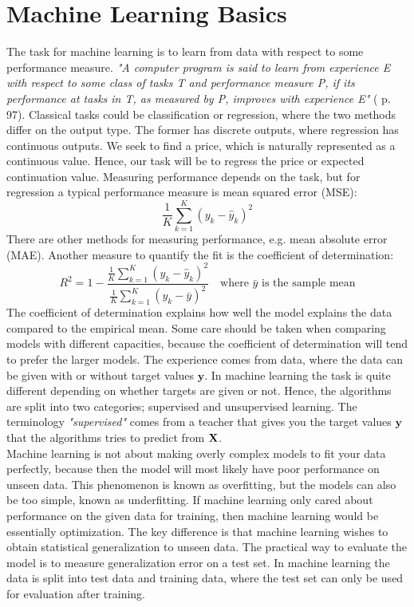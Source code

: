 \section{Machine Learning Basics}
The task for machine learning is to learn from data with respect to some performance measure. \textsl{"A computer program is said to learn from experience E with respect to some class of tasks T and performance measure P, if its performance at tasks in T, as measured by P, improves with experience E"} (\parencite{Goodfellow-et-al-2016} p. 97). Classical tasks could be classification or regression, where the two methods differ on the output type. The former has discrete outputs, where regression has continuous outputs. We seek to find a price, which is naturally represented as a continuous value. Hence, our task will be to regress the price or expected continuation value. Measuring performance depends on the task, but for regression a typical performance measure is mean squared error (MSE):
$$\frac{1}{K}\sum_{k=1}^{K} (y_k-\hat{y}_k)^2$$
There are other methods for measuring performance, e.g. mean absolute error (MAE). Another measure to quantify the fit is the coefficient of determination:
$$R^2=1-\frac{\frac{1}{K}\sum_{k=1}^{K} (y_k-\hat{y}_k)^2}{\frac{1}{K}\sum_{k=1}^{K} (y_k-\bar{y})^2} \quad \text{where $\bar{y}$ is the sample mean}$$
The coefficient of determination explains how well the model explains the data compared to the empirical mean. Some care should be taken when comparing models with different capacities, because the coefficient of determination will tend to prefer the larger models. The experience comes from data, where the data can be given with or without target values $\bm{y}$. In machine learning the task is quite different depending on whether targets are given or not. Hence, the algorithms are split into two categories; supervised and unsupervised learning. The terminology \textsl{"supervised"} comes from a teacher that gives you the target values $\bm{y}$ that the algorithms tries to predict from $\mathbf{X}$.\\

Machine learning is not about making overly complex models to fit your data perfectly, because then the model will most likely have poor performance on unseen data. This phenomenon is known as overfitting, but the models can also be too simple, known as underfitting. If machine learning only cared about performance on the given data for training, then machine learning would be essentially optimization. The key difference is that machine learning wishes to obtain statistical generalization to unseen data. The practical way to evaluate the model is to measure generalization error on a test set. In machine learning the data is split into test data and training data, where the test set can only be used for evaluation after training. \\

